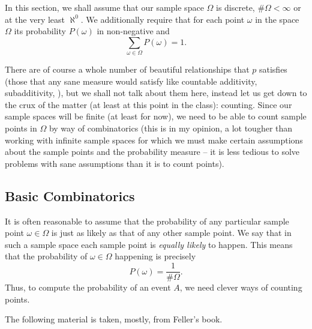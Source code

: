 In this section, we shall assume that our sample space \(\Omega\) is
discrete, \ie{} \(\#\Omega<\infty\) or at the very least \(\aleph^0\). We
additionally require that for each point \(\omega\) in the space \(\Omega\)
its probability \(P(\omega)\) in non-negative and
\begin{equation}
  \label{eq:convention-prob}
  \sum_{\omega\in\Omega}P(\omega)=1.
\end{equation}

There are of course a whole number of beautiful relationships that \(p\)
satisfies (those that any sane measure would satisfy like countable
additivity, subadditivity, \etc{}), but we shall not talk about them here,
instead let us get down to the crux of the matter (at least at this point
in the class): counting. Since our sample spaces will be finite (at least
for now), we need to be able to count sample points in \(\Omega\) by way of
combinatorics (this is in my opinion, a lot tougher than working with
infinite sample spaces for which we must make certain assumptions about the
sample points and the probability measure -- it is less tedious to solve
problems with sane assumptions than it is to count points).

\subsection{Basic Combinatorics}
It is often reasonable to assume that the probability of any particular
sample point \(\omega\in\Omega\) is just as likely as that of any other
sample point. We say that in such a sample space each sample point is
\emph{equally likely} to happen. This means that the probability of
\(\omega\in\Omega\) happening is precisely
\[
  P(\omega)=\frac{1}{\#\Omega}.
\]
Thus, to compute the probability of an event \(A\), we need clever ways of
counting points.

The following material is taken, mostly, from Feller's book.

